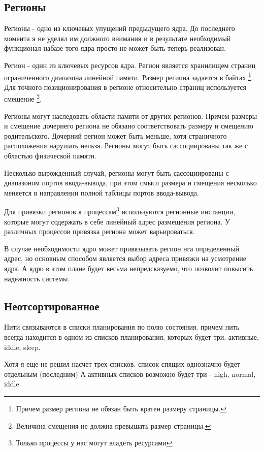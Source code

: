 \subsection{Регионы}

Регионы - одно из ключевых упущений предыдущего ядра. До последнего момента я не
уделял им должного внимания и в результате необходимый функционал набазе того
ядра просто не может быть теперь реализован.

Регион - один из ключевых ресурсов ядра. Регион является хранилищем страниц
ограниченного диапазона линейной памяти. Размер региона задается в байтах
\footnote{Причем размер региона не обязан быть кратен размеру страницы.}. Для
точного позиционирования в регионе относительно страниц используется смещение
\footnote{Величина смещения не должна превышать размер страницы.}.

Регионы могут наследовать области памяти от других регионов. Причем размеры и
смещение дочернего региона не обязано соответствовать размеру и смещению
родительского. Дочерний регион может быть меньше, хотя страничного расположения
нарушать нельзя. Регионы могут быть сассоциированы так же с областью физической
памяти.

Несколько вырожденный случай, регионы могут быть сассоциированы с диапазоном
портов ввода-вывода, при этом смысл размера и смещения несколько меняется в
направлении полной таблицы портов ввода-вывода.

Для привязки регионов к процессам\footnote{Только процессы у нас могут владеть
ресурсами} используются регионные инстанции, которые могут содержать в себе
линейный адрес размещения региона. У различных процессов привязка региона может
варьироваться.

В случае необходимости ядро может привязывать регион нга определенный адрес, но
основным способом является выбор адреса привязки на усмотрение ядра. А ядро в
этом плане будет весьма непредсказуемо, что позволит повысить надежность системы.

\subsection{Неотсортированное}

Нити связываются в списки планирования по полю состояния. причем нить всегда
находится в одном из списков планирования, которых будет три. активные, iddle,
sleep.

Хотя я еще не решил насчет трех списков. список спящих однозначно будет
отдельным (последним) А активных списков возможно будет три - high, normal, iddle

